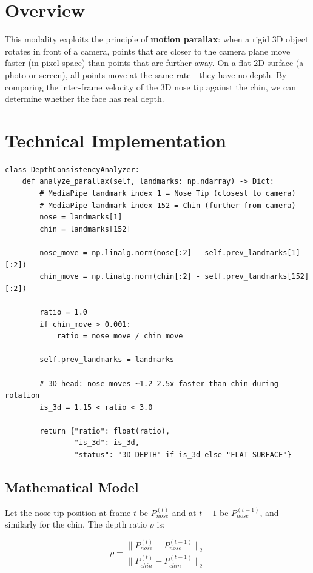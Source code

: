 \documentclass[12pt,a4paper]{report}
\begin{document}
\section{Overview}
This modality exploits the principle of \textbf{motion parallax}: when a rigid 3D object rotates in front of a camera, points that are closer to the camera plane move faster (in pixel space) than points that are further away. On a flat 2D surface (a photo or screen), all points move at the same rate---they have no depth. By comparing the inter-frame velocity of the 3D nose tip against the chin, we can determine whether the face has real depth.

\section{Technical Implementation}

\begin{lstlisting}[style=pythonstyle, caption={Parallax-Based Depth Analysis --- Depth\_Consistency\_Modality.py}]
class DepthConsistencyAnalyzer:
    def analyze_parallax(self, landmarks: np.ndarray) -> Dict:
        # MediaPipe landmark index 1 = Nose Tip (closest to camera)
        # MediaPipe landmark index 152 = Chin (further from camera)
        nose = landmarks[1]
        chin = landmarks[152]

        nose_move = np.linalg.norm(nose[:2] - self.prev_landmarks[1][:2])
        chin_move = np.linalg.norm(chin[:2] - self.prev_landmarks[152][:2])

        ratio = 1.0
        if chin_move > 0.001:
            ratio = nose_move / chin_move

        self.prev_landmarks = landmarks

        # 3D head: nose moves ~1.2-2.5x faster than chin during rotation
        is_3d = 1.15 < ratio < 3.0

        return {"ratio": float(ratio),
                "is_3d": is_3d,
                "status": "3D DEPTH" if is_3d else "FLAT SURFACE"}
\end{lstlisting}

\subsection{Mathematical Model}
Let the nose tip position at frame $t$ be $P_{nose}^{(t)}$ and at $t-1$ be $P_{nose}^{(t-1)}$, and similarly for the chin. The depth ratio $\rho$ is:

\[
\rho = \frac{\| P_{nose}^{(t)} - P_{nose}^{(t-1)} \|_2}{\| P_{chin}^{(t)} - P_{chin}^{(t-1)} \|_2}
\]
\end{document}
